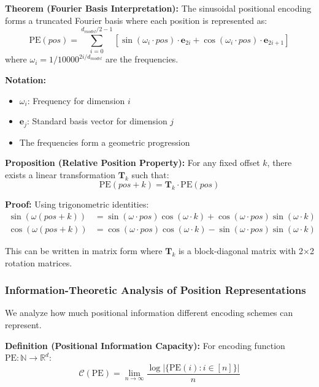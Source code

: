 \textbf{Theorem (Fourier Basis Interpretation):} The sinusoidal positional encoding forms a truncated Fourier basis where each position is represented as:
\begin{equation}
\text{PE}(pos) = \sum_{i=0}^{d_{model}/2-1} \left[\sin(\omega_i \cdot pos) \cdot \mathbf{e}_{2i} + \cos(\omega_i \cdot pos) \cdot \mathbf{e}_{2i+1}\right]
\end{equation}
where $\omega_i = 1/10000^{2i/d_{model}}$ are the frequencies.

\begin{notationbox}
\textbf{Notation:}
\begin{itemize}
    \item $\omega_i$: Frequency for dimension $i$
    \item $\mathbf{e}_j$: Standard basis vector for dimension $j$
    \item The frequencies form a geometric progression
\end{itemize}
\end{notationbox}

\textbf{Proposition (Relative Position Property):} For any fixed offset $k$, there exists a linear transformation $\mathbf{T}_k$ such that:
\begin{equation}
\text{PE}(pos + k) = \mathbf{T}_k \cdot \text{PE}(pos)
\end{equation}

\textbf{Proof:} Using trigonometric identities:
\begin{align}
\sin(\omega(pos + k)) &= \sin(\omega \cdot pos)\cos(\omega \cdot k) + \cos(\omega \cdot pos)\sin(\omega \cdot k) \\
\cos(\omega(pos + k)) &= \cos(\omega \cdot pos)\cos(\omega \cdot k) - \sin(\omega \cdot pos)\sin(\omega \cdot k)
\end{align}

This can be written in matrix form where $\mathbf{T}_k$ is a block-diagonal matrix with 2×2 rotation matrices.

\subsubsection{Information-Theoretic Analysis of Position Representations}

We analyze how much positional information different encoding schemes can represent.

\textbf{Definition (Positional Information Capacity):} For encoding function $\text{PE}: \mathbb{N} \rightarrow \mathbb{R}^d$:
\begin{equation}
\mathcal{C}(\text{PE}) = \lim_{n \rightarrow \infty} \frac{\log |\{\text{PE}(i) : i \in [n]\}|}{n}
\end{equation}

